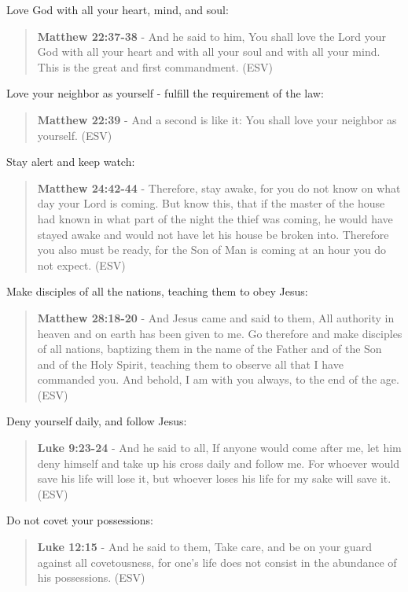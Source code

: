 \documentclass[11pt]{article}
\begin{document}
Love God with all your heart, mind, and soul:

\begin{quote}
\textbf{Matthew 22:37-38} - And he said to him, You shall love the Lord your God with all your heart and with all your soul and with all your mind. This is the great and first commandment. (ESV)
\end{quote}

Love your neighbor as yourself - fulfill the requirement of the law:

\begin{quote}
\textbf{Matthew 22:39} - And a second is like it: You shall love your neighbor as yourself. (ESV)
\end{quote}

Stay alert and keep watch:

\begin{quote}
\textbf{Matthew 24:42-44} - Therefore, stay awake, for you do not know on what day your Lord is coming. But know this, that if the master of the house had known in what part of the night the thief was coming, he would have stayed awake and would not have let his house be broken into. Therefore you also must be ready, for the Son of Man is coming at an hour you do not expect. (ESV)
\end{quote}

Make disciples of all the nations, teaching them to obey Jesus:
\begin{quote}
\textbf{Matthew 28:18-20} - And Jesus came and said to them, All authority in heaven and on earth has been given to me. Go therefore and make disciples of all nations, baptizing them in the name of the Father and of the Son and of the Holy Spirit, teaching them to observe all that I have commanded you. And behold, I am with you always, to the end of the age. (ESV)
\end{quote}

Deny yourself daily, and follow Jesus:

\begin{quote}
\textbf{Luke 9:23-24} - And he said to all, If anyone would come after me, let him deny himself and take up his cross daily and follow me. For whoever would save his life will lose it, but whoever loses his life for my sake will save it. (ESV)
\end{quote}

Do not covet your possessions:

\begin{quote}
\textbf{Luke 12:15} - And he said to them, Take care, and be on your guard against all covetousness, for one's life does not consist in the abundance of his possessions. (ESV)
\end{quote}
\end{document}
